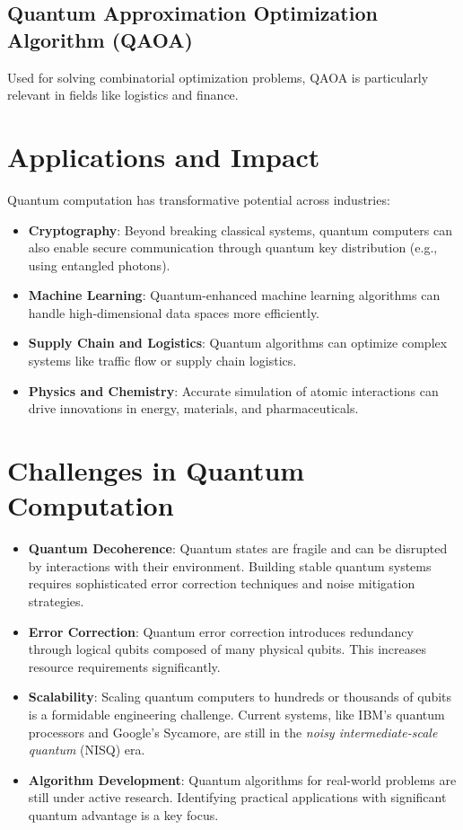 \documentclass[11pt]{article}
\theoremstyle{definition}
\begin{document}
\subsection*{Quantum Approximation Optimization Algorithm (QAOA)}
Used for solving combinatorial optimization problems, QAOA is particularly relevant in fields like logistics and finance.

\section*{Applications and Impact}
Quantum computation has transformative potential across industries:
\begin{itemize}
    \item \textbf{Cryptography}: Beyond breaking classical systems, quantum computers can also enable secure communication through quantum key distribution (e.g., using entangled photons).
    \item \textbf{Machine Learning}: Quantum-enhanced machine learning algorithms can handle high-dimensional data spaces more efficiently.
    \item \textbf{Supply Chain and Logistics}: Quantum algorithms can optimize complex systems like traffic flow or supply chain logistics.
    \item \textbf{Physics and Chemistry}: Accurate simulation of atomic interactions can drive innovations in energy, materials, and pharmaceuticals.
\end{itemize}

\section*{Challenges in Quantum Computation}
\begin{itemize}
    \item \textbf{Quantum Decoherence}: Quantum states are fragile and can be disrupted by interactions with their environment. Building stable quantum systems requires sophisticated error correction techniques and noise mitigation strategies.
    \item \textbf{Error Correction}: Quantum error correction introduces redundancy through logical qubits composed of many physical qubits. This increases resource requirements significantly.
    \item \textbf{Scalability}: Scaling quantum computers to hundreds or thousands of qubits is a formidable engineering challenge. Current systems, like IBM's quantum processors and Google's Sycamore, are still in the \textit{noisy intermediate-scale quantum} (NISQ) era.
    \item \textbf{Algorithm Development}: Quantum algorithms for real-world problems are still under active research. Identifying practical applications with significant quantum advantage is a key focus.
\end{itemize}
\end{document}
